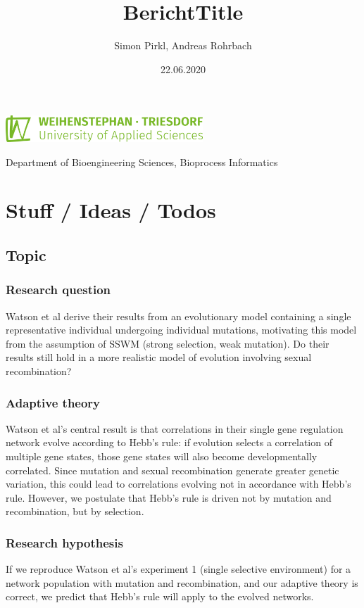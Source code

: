 \documentclass{article}
\title{BerichtTitle}
\date{22.06.2020}
\author{Simon Pirkl, Andreas Rohrbach}
\begin{document}
\maketitle

\begin{center}
	\includegraphics[height=10mm]{./img/ci/HSWT_Logo_gruen.png}

	\vspace{5mm}
	Department of Bioengineering Sciences, Bioprocess Informatics
\end{center}


\tableofcontents
\newpage

\section{Stuff / Ideas / Todos}

\subsection{Topic}
\subsubsection{Research question}
Watson et al derive their results from an evolutionary model containing a single representative individual undergoing individual mutations, motivating this model from the assumption of SSWM (strong selection, weak mutation). Do their results still hold in a more realistic model of evolution involving sexual recombination?

\subsubsection{Adaptive theory}
Watson et al’s central result is that correlations in their single gene regulation network evolve according to Hebb’s rule: if evolution selects a correlation of multiple gene states, those gene states will also become developmentally correlated. Since mutation and sexual recombination generate greater genetic variation, this could lead to correlations evolving not in accordance with Hebb's rule. However, we postulate that Hebb’s rule is driven not by mutation and recombination, but by selection.

\subsubsection{Research hypothesis}
If we reproduce Watson et al’s experiment 1 (single selective environment) for a network population with mutation and recombination, and our adaptive theory is correct, we predict that Hebb’s rule will apply to the evolved networks.
\end{document}
